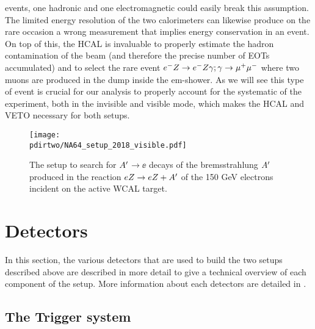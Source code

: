 events, one hadronic and one electromagnetic could easily break this assumption. The limited energy resolution of the two calorimeters can likewise produce on the rare occasion a wrong measurement that implies energy conservation in an event. On top of this, the HCAL is invaluable to properly estimate the hadron contamination of the beam (and therefore the precise number of EOTs accumulated) and to select the rare event $e^- Z \to e^- Z \gamma; \gamma \to \mu^+ \mu^-$ where two muons are produced in the dump inside the em-shower. As we will see this type of event is crucial for our analysis to properly account for the systematic of the experiment, both in the invisible and visible mode, which makes the HCAL and VETO necessary for both setups.

\iffalse
The method of the search for $\aee$ (or $\xdecay$) decays is detailed in . Here, we review it briefly. The $\DM$ is produced via scattering of 150 GeV electrons off nuclei of an active target-dump. The $\DM$ production is followed by its decay into $\ee$ pairs:
detailed in \cite{Gninenko:2013rka, Andreas:2013lya, gkkk1, DMsimulation}, 
\begin{equation}
e^- + Z \to e^- + Z + \DM ;~ \DM\to \ee \,.
\label{ea}
\end{equation}
\fi

\begin{figure}[tb]
\centering
\texttt{[image: \\pdirtwo/NA64\_setup\_2018\_visible.pdf]}
\caption[NA64 visible mode setup 2018]{The setup to search for $\DM$$\to \ee$ decays of the bremsstrahlung $\DM$ produced in the reaction
$eZ \to eZ+A' $ of the 150 GeV electrons incident on the active WCAL target.}
\label{fig:setup-vis-2018}
\end{figure}

\section{Detectors}
\label{ch2:sec:detectors}

In this section, the various detectors that are used to build the two setups described above are described in more detail to give a technical overview of each component of the setup. More information about each detectors are detailed in \cite{na64-hcal,na64-detectors,ABBON201569}. 

\subsection{The Trigger system}
\label{ch2:sec:detectors-trigger}

